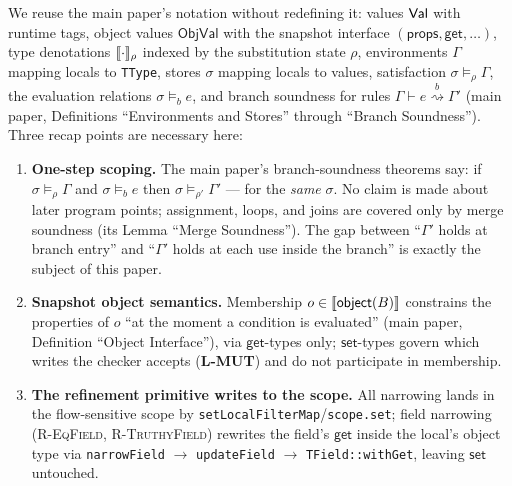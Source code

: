 \documentclass[11pt]{article}
\newcommand{\ObjVal}{\mathsf{ObjVal}}
\newcommand{\Env}{\Gamma}
\newcommand{\RefineB}[4]{#1 \vdash #2 \stackrel{#4}{\rightsquigarrow} #3}
\begin{document}
We reuse the main paper's notation without redefining it: values $\mathsf{Val}$
with runtime tags, object values $\ObjVal$ with the snapshot interface
$(\mathsf{props}, \mathsf{get}, \dots)$, type denotations
$\llbracket \cdot \rrbracket_\rho$ indexed by the substitution state $\rho$, environments
$\Env$ mapping locals to \texttt{TType}, stores $\sigma$ mapping locals to
values, satisfaction $\sigma \models_\rho \Env$, the evaluation relations
$\sigma \models_b e$, and branch soundness for rules
$\RefineB{\Env}{e}{\Env'}{b}$ (main paper, Definitions ``Environments
and Stores'' through ``Branch Soundness''). Three
recap points are necessary here:
\begin{enumerate}
\item \textbf{One-step scoping.} The main paper's branch-soundness
  theorems say: if $\sigma \models_\rho \Env$ and $\sigma \models_b e$
  then $\sigma \models_{\rho'} \Env'$ — for the \emph{same} $\sigma$. No
  claim is made about later program points; assignment, loops, and joins
  are covered only by merge soundness (its Lemma ``Merge Soundness'').
  The gap between
  ``$\Env'$ holds at branch entry'' and ``$\Env'$ holds at each use inside
  the branch'' is exactly the subject of this paper.
\item \textbf{Snapshot object semantics.} Membership
  $o \in \llbracket \mathsf{object}(B) \rrbracket$ constrains the properties of $o$ ``at
  the moment a condition is evaluated'' (main paper, Definition
  ``Object Interface''), via
  $\mathsf{get}$-types only; $\mathsf{set}$-types govern which writes the
  checker accepts (\textbf{L-MUT}) and do not participate in membership.
\item \textbf{The refinement primitive writes to the scope.} All narrowing
  lands in the flow-sensitive scope by
  \texttt{setLocalFilterMap}/\texttt{scope.set}; field narrowing
  (\textsc{R-EqField}, \textsc{R-TruthyField}) rewrites the field's
  $\mathsf{get}$ inside the local's object type via
  \texttt{narrowField} $\to$ \texttt{updateField} $\to$
  \texttt{TField::withGet}, leaving $\mathsf{set}$ untouched.
\end{enumerate}
\end{document}
